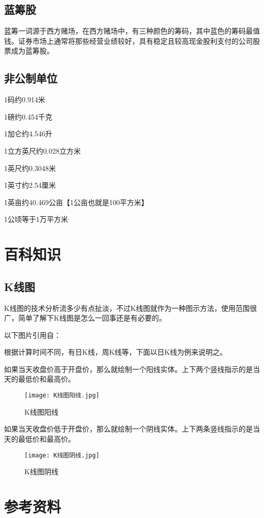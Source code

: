 \documentclass[12pt,oneside]{book}
\begin{document}
\section{蓝筹股}
蓝筹一词源于西方赌场，在西方赌场中，有三种颜色的筹码，其中蓝色的筹码最值钱。证券市场上通常将那些经营业绩较好，具有稳定且较高现金股利支付的公司股票成为蓝筹股。


\section{非公制单位}
1码约0.914米

1磅约0.454千克

1加仑约4.546升

1立方英尺约0.028立方米

1英尺约0.3048米

1英寸约2.54厘米

1英亩约40.469公亩【1公亩也就是100平方米】

1公顷等于1万平方米

\chapter{百科知识}
\section{K线图}
K线图的技术分析流多少有点扯淡，不过K线图就作为一种图示方法，使用范围很广，简单了解下K线图是怎么一回事还是有必要的。

以下图片引用自\cite{从零开始学K线}：

根据计算时间不同，有日K线，周K线等，下面以日K线为例来说明之。

如果当天收盘价高于开盘价，那么就绘制一个阳线实体。上下两个竖线指示的是当天的最低价和最高价。

\begin{figure}[H]
\centering
\texttt{[image: K线图阳线.jpg]}
\caption{K线图阳线}
\end{figure}

如果当天收盘价低于开盘价，那么就绘制一个阴线实体。上下两条竖线指示的是当天的最低价和最高价。

\begin{figure}[H]
\centering
\texttt{[image: K线图阴线.jpg]}
\caption{K线图阴线}
\end{figure}


\backmatter
\chapter*{参考资料}
\end{document}
